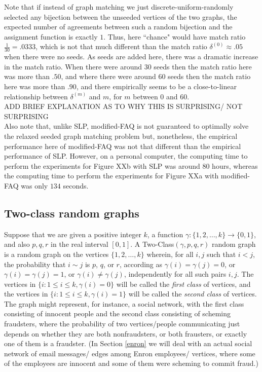 \documentclass[12pt]{article}
\begin{document}
Note that if instead of graph matching we just discrete-uniform-randomly
selected any bijection between the unseeded vertices of the two graphs,
the expected number of agreements between such a random bijection and
the assignment function is exactly $1$. Thus, here
``chance" would have match ratio $\frac{1}{30}=.0333$, which is not that
much different than the match ratio $\delta^{(0)} \approx .05$
when there were no seeds. As seeds are added here, there was a dramatic
increase in the match ratio. When there were
around $30$ seeds then the match ratio here was more than
$.50$, and where there were around $60$ seeds then the
match ratio here was more than $.90$, and there empirically seems
to be a close-to-linear relationship between  $\delta^{(m)}$ and $m$,
for $m$ between $0$ and $60$.\\

ADD BRIEF EXPLANATION AS TO WHY THIS IS SURPRISING/ NOT SURPRISING\\


Also note that, unlike SLP, modified-FAQ is not
guaranteed to optimally solve the relaxed seeded graph matching problem
but, nonetheless, the empirical performance here of modified-FAQ was
not that different than the empirical performance of SLP. However,  
on a personal computer, the computing time to perform the experiments for
Figure XXb with SLP was around $80$ hours, whereas the computing time
to perform the experiments for Figure XXa with modified-FAQ was
only $134$ seconds.

\newpage

\subsection{Two-class random graphs}


Suppose that we are given a positive integer $k$,
a function $\gamma: \{ 1,2,\ldots,k \} \rightarrow
\{0,1\}$, and also $p,q,r$ in the real interval $[0,1]$.
A Two-Class$(\gamma,p,q,r)$ random graph is a random
graph on the vertices $\{1,2,\ldots,k\}$ wherein, for
all $i,j$ such that $i<j$, the probability that $i \sim j$
is $p$, $q$, or $r$, according as $\gamma(i)=\gamma(j)=0$, or
$\gamma(i)=\gamma(j)=1$, or $\gamma(i)\ne \gamma(j)$, independently for
all such pairs $i,j$. The vertices in
$\{i:1 \leq i \leq k, \gamma(i)=0 \}$ will be called the {\it first class}
of vertices, and the vertices in $\{i:1 \leq i \leq k, \gamma(i)=1 \}$
will be called the {\it second class} of vertices. The graph
might represent, for instance, a social network, with the first class consisting
of innocent people and the second class consisting of scheming fraudsters,
where the probability of two vertices/people communicating
just depends on whether they are both nonfraudsters, or both frausters,
or exactly one of them is a fraudster. (In Section \ref{enron} we will
deal with an actual social network of email messages/ edges
among Enron employees/ vertices, where some of the employees are innocent
and some of them were scheming to commit fraud.)
\end{document}
